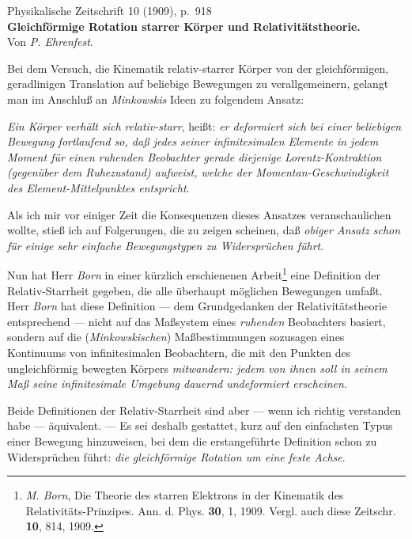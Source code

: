 \documentclass[12pt,a4paper]{article}
\newcommand{\opage}[1]{\marginnote{\footnotesize\textit{[#1]}}}
\begin{document}
\thispagestyle{plain}
\begin{center}
{\small Physikalische Zeitschrift 10 (1909), p.~918}\\[1.5em]
{\Large\bfseries Gleichförmige Rotation starrer Körper und Relativitätstheorie.}\\[1em]
{\large Von \emph{P. Ehrenfest}.}
\end{center}
\bigskip

\opage{918}Bei dem Versuch, die Kinematik relativ-starrer Körper von der gleichförmigen, geradlinigen Translation auf beliebige Bewegungen zu verallgemeinern, gelangt man im Anschluß an \emph{Minkowskis} Ideen zu folgendem Ansatz:

\emph{Ein Körper verhält sich relativ-starr}, heißt: \emph{er deformiert sich bei einer beliebigen Bewegung fortlaufend so, daß jedes seiner infinitesimalen Elemente in jedem Moment für einen ruhenden Beobachter gerade diejenige Lorentz-Kontraktion (gegenüber dem Ruhezustand) aufweist, welche der Momentan-Geschwindigkeit des Element-Mittelpunktes entspricht}.

Als ich mir vor einiger Zeit die Konsequenzen dieses Ansatzes veranschaulichen wollte, stieß ich auf Folgerungen, die zu zeigen scheinen, daß \emph{obiger Ansatz schon für einige sehr einfache Bewegungstypen zu Widersprüchen führt}.

Nun hat Herr \emph{Born} in einer kürzlich erschienenen Arbeit\footnote[1]{\emph{M. Born}, Die Theorie des starren Elektrons in der Kinematik des Relativitäts-Prinzipes. Ann. d. Phys. \textbf{30}, 1, 1909. Vergl. auch diese Zeitschr. \textbf{10}, 814, 1909.} eine Definition der Relativ-Starrheit gegeben, die alle überhaupt möglichen Bewegungen umfaßt. Herr \emph{Born} hat diese Definition --- dem Grundgedanken der Relativitätstheorie entsprechend --- nicht auf das Maßsystem eines \emph{ruhenden} Beobachters basiert, sondern auf die (\emph{Minkowskischen}) Maßbestimmungen sozusagen eines Kontinuums von infinitesimalen Beobachtern, die mit den Punkten des ungleichförmig bewegten Körpers \emph{mitwandern: jedem von ihnen soll in seinem Maß seine infinitesimale Umgebung dauernd undeformiert erscheinen}.

Beide Definitionen der Relativ-Starrheit sind aber --- wenn ich richtig verstanden habe --- äquivalent. --- Es sei deshalb gestattet, kurz auf den einfachsten Typus einer Bewegung hinzuweisen, bei dem die erstangeführte Definition schon zu Widersprüchen führt: \emph{die gleichförmige Rotation um eine feste Achse}.
\end{document}
